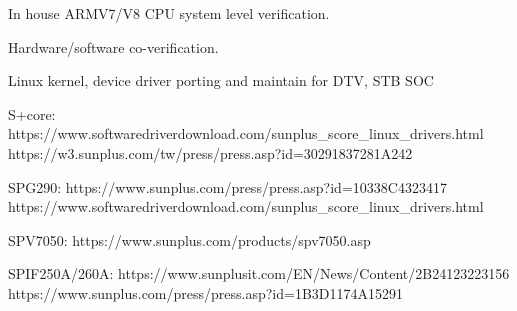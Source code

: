 In house ARMV7/V8 CPU system level verification.

Hardware/software co-verification.

Linux kernel, device driver porting and maintain for DTV, STB SOC


S+core:
https://www.softwaredriverdownload.com/sunplus_score_linux_drivers.html
https://w3.sunplus.com/tw/press/press.asp?id=30291837281A242



SPG290:
https://www.sunplus.com/press/press.asp?id=10338C4323417
https://www.softwaredriverdownload.com/sunplus_score_linux_drivers.html

SPV7050:
https://www.sunplus.com/products/spv7050.asp

SPIF250A/260A:
https://www.sunplusit.com/EN/News/Content/2B24123223156
https://www.sunplus.com/press/press.asp?id=1B3D1174A15291
